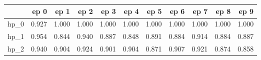 \begin{tabular}{lrrrrrrrrrr}
\toprule
{} &   ep 0 &   ep 1 &   ep 2 &   ep 3 &   ep 4 &   ep 5 &   ep 6 &   ep 7 &   ep 8 &   ep 9 \\
\midrule
hp\_0 &  0.927 &  1.000 &  1.000 &  1.000 &  1.000 &  1.000 &  1.000 &  1.000 &  1.000 &  1.000 \\
hp\_1 &  0.954 &  0.844 &  0.940 &  0.887 &  0.848 &  0.891 &  0.884 &  0.914 &  0.884 &  0.887 \\
hp\_2 &  0.940 &  0.904 &  0.924 &  0.901 &  0.904 &  0.871 &  0.907 &  0.921 &  0.874 &  0.858 \\
\bottomrule
\end{tabular}
